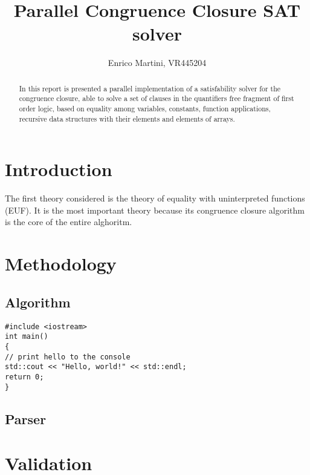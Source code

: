 \documentclass{IEEEtran}
\begin{document}
\title{Parallel Congruence Closure SAT solver}
\author{Enrico Martini, VR445204}
\maketitle
\begin{abstract}
 In this report is presented a parallel implementation of a satisfability solver for the congruence closure, able to solve a set of clauses in the quantifiers free fragment of first order logic, based on equality among variables, constants, function applications, recursive data structures with their elements and elements of arrays.
\end{abstract}
\section{Introduction}
The first theory considered is the theory of equality with uninterpreted functions (EUF). It is the most important theory because its congruence closure algorithm is the core of the entire alghoritm. 
\section{Methodology}


\subsection{Algorithm}
\begin{lstlisting}[style=cpp]
#include <iostream>
int main()
{
// print hello to the console
std::cout << "Hello, world!" << std::endl;
return 0;
}
\end{lstlisting}

\subsection{Parser}


\section{Validation}
\end{document}
